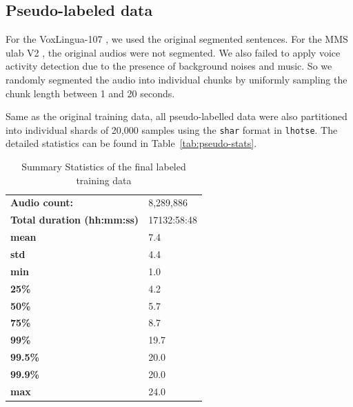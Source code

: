 \documentclass[11pt]{article}
\begin{document}
\subsection{Pseudo-labeled data}
For the VoxLingua-107 \cite{valk2021voxlingua107}, we used the original segmented sentences. For the MMS ulab V2 \cite{peng-etal-2024-owsm}, the original audios were not segmented. We also failed to apply voice activity detection due to the presence of background noises and music. So we randomly segmented the audio into individual chunks by uniformly sampling the chunk length between 1 and 20 seconds. 

Same as the original training data, all pseudo-labelled data were also partitioned into individual shards of 20,000 samples using the \texttt{shar} format in \texttt{lhotse}. The detailed statistics can be found in Table~\ref{tab:pseudo-stats}.

\begin{table}[ht]
\centering
\begin{tabular}{ll}
\toprule
\textbf{Audio count:}               & 8,289,886       \\
\textbf{Total duration (hh:mm:ss)}  & 17132:58:48 \\ 
\textbf{mean}                       & 7.4         \\
\textbf{std}                        & 4.4         \\ 
\textbf{min}                        & 1.0         \\ 
\textbf{25\%}                       & 4.2         \\ 
\textbf{50\%}                       & 5.7         \\ 
\textbf{75\%}                       & 8.7         \\ 
\textbf{99\%}                       & 19.7        \\ 
\textbf{99.5\%}                     & 20.0        \\ 
\textbf{99.9\%}                     & 20.0        \\ 
\textbf{max}                        & 24.0        \\ \bottomrule
\end{tabular}
\caption{Summary Statistics of the final labeled training data}
\label{tab:training-stats}
\end{table}
\end{document}
